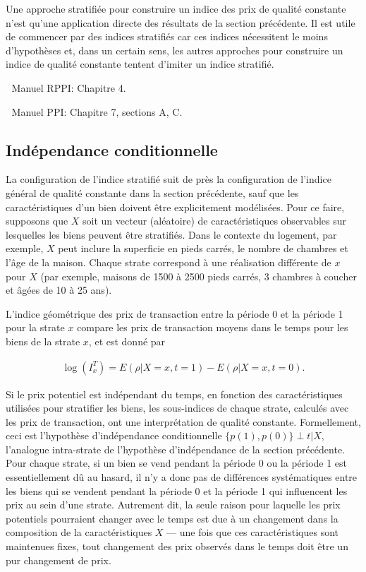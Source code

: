 \documentclass[]{article}
\begin{document}
Une approche stratifiée pour construire un indice des prix de qualité constante n'est qu'une application directe des résultats de la section précédente. Il est utile de commencer par des indices stratifiés car ces indices nécessitent le moins d'hypothèses et, dans un certain sens, les autres approches pour construire un indice de qualité constante tentent d'imiter un indice stratifié.

📖 Manuel RPPI: Chapitre 4.

📖 Manuel PPI: Chapitre 7, sections A, C.

\hypertarget{induxe9pendance-conditionnelle}{%
\subsection{Indépendance conditionnelle}\label{induxe9pendance-conditionnelle}}

La configuration de l'indice stratifié suit de près la configuration de l'indice général de qualité constante dans la section précédente, sauf que les caractéristiques d'un bien doivent être explicitement modélisées. Pour ce faire, supposons que \(X\) soit un vecteur (aléatoire) de caractéristiques observables sur lesquelles les biens peuvent être stratifiés. Dans le contexte du logement, par exemple, \(X\) peut inclure la superficie en pieds carrés, le nombre de chambres et l'âge de la maison. Chaque strate correspond à une réalisation différente de \(x\) pour \(X\) (par exemple, maisons de 1500 à 2500 pieds carrés, 3 chambres à coucher et âgées de 10 à 25 ans).

L'indice géométrique des prix de transaction entre la période 0 et la période 1 pour la strate \(x\) compare les prix de transaction moyens dans le temps pour les biens de la strate \(x\), et est donné par

\begin{align*}
\log (I^{T}_{x}) = E(\rho | X = x, t = 1) - E(\rho | X = x, t = 0).
\end{align*}

Si le prix potentiel est indépendant du temps, en fonction des caractéristiques utilisées pour stratifier les biens, les sous-indices de chaque strate, calculés avec les prix de transaction, ont une interprétation de qualité constante. Formellement, ceci est l'hypothèse d'indépendance conditionnelle \(\{p(1), p(0)\} \perp t | X\), l'analogue intra-strate de l'hypothèse d'indépendance de la section précédente. Pour chaque strate, si un bien se vend pendant la période 0 ou la période 1 est essentiellement dû au hasard, il n'y a donc pas de différences systématiques entre les biens qui se vendent pendant la période 0 et la période 1 qui influencent les prix au sein d'une strate. Autrement dit, la seule raison pour laquelle les prix potentiels pourraient changer avec le temps est due à un changement dans la composition de la caractéristiques \(X\) --- une fois que ces caractéristiques sont maintenues fixes, tout changement des prix observés dans le temps doit être un pur changement de prix.
\end{document}
